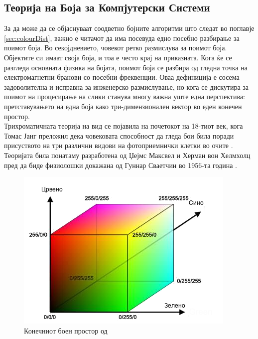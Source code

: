 \documentclass[11pt]{article}
\begin{document}
  \subsection{Теорија на Боја за Компјутерски Системи}
    \label{sec:colour_theory}
    За да може да се објаснуваат соодветно бојните алгоритми што следат во поглавје \ref{sec:colourDist}, важно е читачот да има посевуда едно посебно разбирање за поимот боја.
    Во секојдневието, човекот ретко размислува за поимот боја. Објектите си имаат своја боја, и тоа е често крај на приказната. Кога ќе се разгледа основната физика на бојата, поимот боја се разбира од гледна точка на електромагнетни бранови со посебни фреквенции. Оваа дефиниција е сосема задоволителна и исправна за инженерско размислување, но кога се дискутира за поимот на процесирање на слики станува многу важна уште една перспектива: претставувањето на една боја како три-димензионален вектор во еден конечен простор.
    \\
    Трихроматичната теорија на вид се појавила на почетокот на 18-тиот век, кога Томас Јанг преложил дека човековата способност да гледа бои била поради присуството на три различни видови на фотоприемнички клетки во очите \cite{young}. Теоријата била понатаму разработена од Џејмс Максвел и Херман вон Хелмхолц пред да биде физиолошки докажана од Гуннар Сваетчин во 1956-та година \cite{svaetchin}.
    \bigbreak
    \begin{figure}[h]
      \centering
      \includegraphics[width = 0.6\linewidth]{./images/colour_cube_mk.png}
      \caption{Конечниот боен простор од \cite{colourcube}}
      \label{fig:colour_cube}

      \end{figure}
\end{document}
